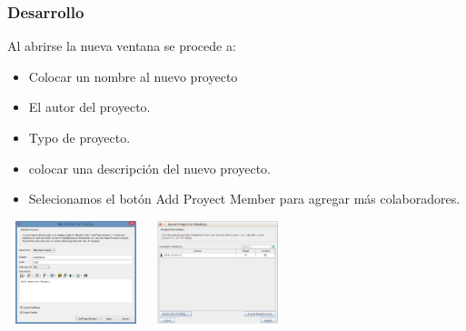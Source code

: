 \documentclass[8pt]{beamer}
\begin{document}
\begin{frame}
\frametitle{Desarrollo}
Al abrirse la nueva ventana se procede a:

\setlength{\parskip}{03pt}
\begin{center}
\begin{itemize}
\item{Colocar un nombre al nuevo proyecto}
\item{El autor del proyecto.}
\item{Typo de proyecto.}
\item{colocar una descripción del nuevo proyecto.}
\item{Selecionamos el botón Add Proyect Member para agregar más colaboradores.}
\end{itemize} 

\setlength{\parskip}{08pt}
\includegraphics[width=4cm, height=3cm]{img/cap10} \hspace{0.5cm}
\includegraphics[width=4cm, height=3cm]{img/cap11}
\end{center}
\end{frame}
\end{document}
